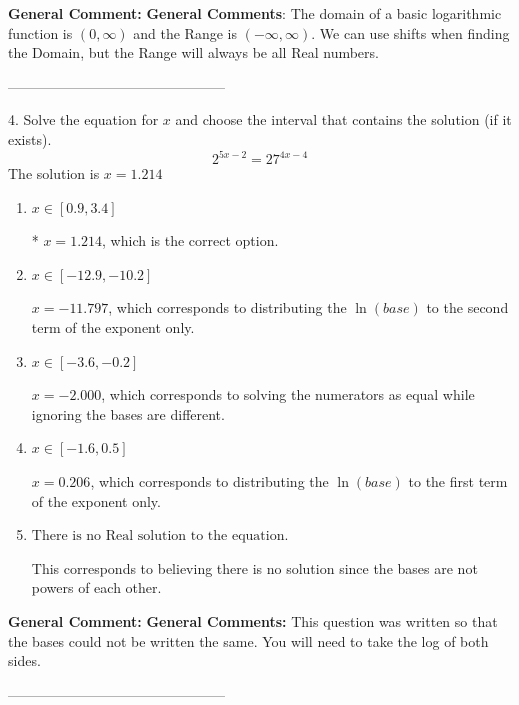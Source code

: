 \documentclass{extbook}[14pt]
\begin{document}
\textbf{General Comment:} \textbf{General Comments}: The domain of a basic logarithmic function is $(0, \infty)$ and the Range is $(-\infty, \infty)$. We can use shifts when finding the Domain, but the Range will always be all Real numbers. 

-----------------------------------------------

4. Solve the equation for $x$ and choose the interval that contains the solution (if it exists).
\[ 2^{5x-2} = 27^{4x-4} \] 
The solution is $ x = 1.214 $ 

\begin{enumerate}[label=\Alph*.] 
\item $ x \in [0.9, 3.4] $ 

 * $x = 1.214$, which is the correct option. 
\item $ x \in [-12.9, -10.2] $ 

 $x = -11.797$, which corresponds to distributing the $\ln(base)$ to the second term of the exponent only. 
\item $ x \in [-3.6, -0.2] $ 

 $x = -2.000$, which corresponds to solving the numerators as equal while ignoring the bases are different. 
\item $ x \in [-1.6, 0.5] $ 

 $x = 0.206$, which corresponds to distributing the $\ln(base)$ to the first term of the exponent only. 
\item $ \text{There is no Real solution to the equation.} $ 

 This corresponds to believing there is no solution since the bases are not powers of each other. 
\end{enumerate} 
 
\textbf{General Comment:} \textbf{General Comments:} This question was written so that the bases could not be written the same. You will need to take the log of both sides. 

-----------------------------------------------
\end{document}
